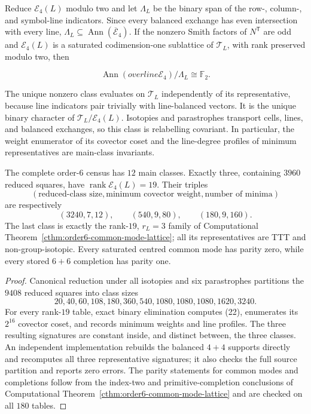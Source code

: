 Reduce $\mathcal E_4(L)$ modulo two and let $\Lambda_L$ be the binary span of
the row-, column-, and symbol-line indicators.  Since every balanced exchange
has even intersection with every line,
$\Lambda_L\subseteq\operatorname{Ann}(\overline{\mathcal E}_4)$.  If the
nonzero Smith factors of $N^{\mathsf T}$ are odd and $\mathcal E_4(L)$ is a
saturated codimension-one sublattice of $\mathcal T_L$, with rank preserved
modulo two, then


\[
 \operatorname{Ann}(overline{\mathcal E}_4)/\Lambda_L\cong\mathbb F_2.
 \tag{22}
\]

The unique nonzero class evaluates on $\mathcal T_L$ independently of its
representative, because line indicators pair trivially with line-balanced
vectors.  It is the unique binary character of
$\mathcal T_L/\mathcal E_4(L)$.  Isotopies and parastrophes transport cells,
lines, and balanced exchanges, so this class is relabelling covariant.  In
particular, the weight enumerator of its covector coset and the line-degree
profiles of minimum representatives are main-class invariants.

\begin{computationaltheorem}
\label{cthm:order6-intrinsic-exchange-parity}
The complete order-$6$ census has $12$ main classes.  Exactly three, containing
$3960$ reduced squares, have $\operatorname{rank}\mathcal E_4(L)=19$.  Their
triples
\[
 (\text{reduced-class size},\text{minimum covector weight},
   \text{number of minima})
\]
are respectively
\[
 (3240,7,12),\qquad(540,9,80),\qquad(180,9,160).
\]
The last class is exactly the rank-$19$, $r_L=3$ family of Computational
Theorem~\ref{cthm:order6-common-mode-lattice}; all its representatives are
TTT and non-group-isotopic.  Every saturated centred common mode has parity
zero, while every stored $6+6$ completion has parity one.
\end{computationaltheorem}

\begin{proof}
Canonical reduction under all isotopies and six parastrophes partitions the
$9408$ reduced squares into class sizes
\[
20,40,60,108,180,360,540,1080,1080,1080,1620,3240.
\]
For every rank-$19$ table, exact binary elimination computes (22), enumerates
its $2^{16}$ covector coset, and records minimum weights and line profiles.
The three resulting signatures are constant inside, and distinct between,
the three classes.  An independent implementation rebuilds the balanced
$4+4$ supports directly and recomputes all three representative signatures;
it also checks the full source partition and reports zero errors.  The parity
statements for common modes and completions follow from the index-two and
primitive-completion conclusions of Computational
Theorem~\ref{cthm:order6-common-mode-lattice} and are checked on all $180$
tables.
\end{proof}

